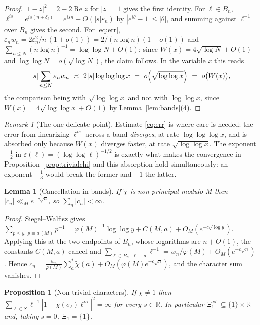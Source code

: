 \documentclass[11pt]{amsart}
\numberwithin{equation}{section}
\newtheorem{proposition}[theorem]{Proposition}
\newtheorem{lemma}[theorem]{Lemma}
\theoremstyle{definition}
\theoremstyle{remark}
\newtheorem{remark}[theorem]{Remark}
\newcommand{\R}{\mathbb{R}}
\begin{document}
\begin{proof}
$|1-z|^2=2-2\operatorname{Re}z$ for $|z|=1$ gives the first identity. For $\ell\in B_n$,
$\ell^{is}=e^{is(n+\delta_\ell)}=e^{isn}+O(|s|\varepsilon_n)$ by $|e^{i\theta}-1|\le|\theta|$,
and summing against $\ell^{-1}$ over $B_n$ gives the second. For \eqref{eq:err},
$\varepsilon_nw_n=2\varepsilon_n^2/n\,(1+o(1))=2/(n\log n)(1+o(1))$ and
$\sum_{n\le N}(n\log n)^{-1}=\log\log N+O(1)$; since $W(x)=4\sqrt{\log N}+O(1)$ and
$\log\log N=o(\sqrt{\log N})$, the claim follows. In the variable $x$ this reads
\begin{equation}\label{eq:absorb}
|s|\sum_{n\le N}\varepsilon_nw_n\ \asymp\ 2|s|\log\log\log x
\ =\ o\Bigl(\sqrt{\log\log x}\Bigr)\ =\ o\bigl(W(x)\bigr),
\end{equation}
the comparison being with $\sqrt{\log\log x}$ and not with $\log\log x$, since
$W(x)=4\sqrt{\log\log x}+O(1)$ by Lemma~\ref{lem:bands}(4).
\end{proof}

\begin{remark}[The one delicate point]\label{rem:delicate}
Estimate \eqref{eq:err} is where care is needed: the error from linearizing $\ell^{is}$
across a band \emph{diverges}, at rate $\log\log\log x$, and is absorbed only because $W(x)$
diverges faster, at rate $\sqrt{\log\log x}$. The exponent $-\tfrac12$ in
$\varepsilon(\ell)=(\log\log\ell)^{-1/2}$ is exactly what makes the convergence in
Proposition~\ref{prop:trivialchi} and this absorption hold simultaneously: an exponent
$-\tfrac13$ would break the former and $-1$ the latter.
\end{remark}

\begin{lemma}[Cancellation in bands]\label{lem:SW}
If $\tilde\chi$ is non-principal modulo $M$ then $|c_n|\ll_M e^{-c\sqrt n}$, so
$\sum_n|c_n|<\infty$.
\end{lemma}

\begin{proof}
Siegel--Walfisz gives
$\sum_{p\le y,\ p\equiv a\,(M)}p^{-1}=\varphi(M)^{-1}\log\log y+C(M,a)+O_M(e^{-c\sqrt{\log y}})$.
Applying this at the two endpoints of $B_n$, whose logarithms are $n+O(1)$, the constants
$C(M,a)$ cancel and
$\sum_{\ell\in B_n,\ \ell\equiv a}\ell^{-1}=w_n/\varphi(M)+O_M(e^{-c\sqrt n})$. Hence
$c_n=\frac{w_n}{\varphi(M)}\sum_a^{*}\tilde\chi(a)+O_M(\varphi(M)e^{-c\sqrt n})$,
and the character sum vanishes.
\end{proof}

\begin{proposition}[Non-trivial characters]\label{prop:chinontriv}
If $\chi\ne1$ then $\sum_{\ell\in S}\ell^{-1}|1-\chi(\sigma_\ell)\ell^{is}|^2=\infty$ for
\emph{every} $s\in\R$. In particular $\Xi^{\mathrm{ext}}_1\subseteq\{1\}\times\R$ and, taking
$s=0$, $\Xi_1=\{1\}$.
\end{proposition}
\end{document}
